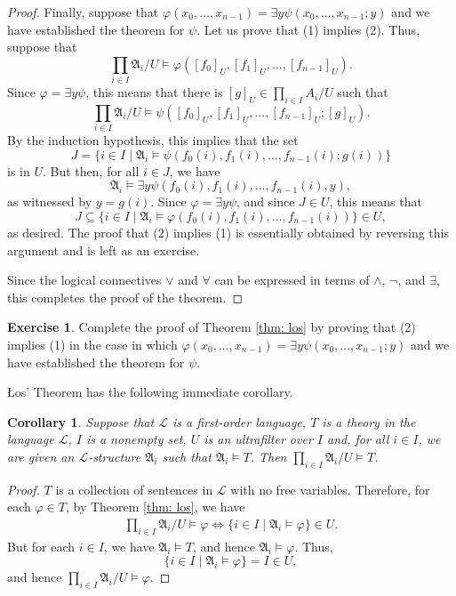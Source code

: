 \documentclass[a4paper]{memoir}
\newtheorem{corollary}[theorem]{Corollary}
\theoremstyle{definition}
\newtheorem{exercise}[theorem]{Exercise}
\newcommand{\mc}{\mathcal}
\begin{document}
\begin{proof}
  Finally, suppose that $\varphi(x_0, \ldots, x_{n-1}) = \exists y \psi(x_0, \ldots, x_{n-1};y)$ 
  and we have established the theorem for $\psi$. Let us prove that (1) implies (2). Thus, suppose that
  \[
    \prod_{i \in I} \mathfrak{A}_i/U \models \varphi([f_0]_U, [f_1]_U, \ldots, [f_{n-1}]_U).
  \]
  Since $\varphi = \exists y \psi$, this means that there is $[g]_U \in \prod_{i \in I} A_i/U$ such that
  \[
    \prod_{i \in I} \mathfrak{A}_i/U \models \psi([f_0]_U, [f_1]_U, \ldots, [f_{n-1}]_U; [g]_U).
  \]
  By the induction hypothesis, this implies that the set 
  \[
    J = \{i \in I \mid \mathfrak{A}_i \models \psi(f_0(i), f_1(i), \ldots, f_{n-1}(i); g(i))\}
  \]
  is in $U$. But then, for all $i \in J$, we have
  \[
    \mathfrak{A}_i \models \exists y \psi(f_0(i), f_1(i), \ldots, f_{n-1}(i), y),
  \]
  as witnessed by $y = g(i)$. Since $\varphi = \exists y \psi$, and since $J \in U$, this means that 
  \[
    J \subseteq \{i \in I \mid \mathfrak{A}_i \models \varphi(f_0(i), f_1(i), \ldots, f_{n-1}(i))\} 
    \in U, 
  \]
  as desired. The proof that (2) implies (1) is essentially obtained by reversing this argument and 
  is left as an exercise.
  
  Since the logical connectives $\vee$ and $\forall$ can be expressed in terms of $\wedge$, $\neg$, and 
  $\exists$, this completes the proof of the theorem.
\end{proof}

\begin{exercise}
  Complete the proof of Theorem \ref{thm: los} by proving that (2) implies (1) in the case in which 
  $\varphi(x_0, \ldots, x_{n-1}) = \exists y \psi(x_0, \ldots, x_{n-1};y)$ 
  and we have established the theorem for $\psi$.
\end{exercise}

\L os' Theorem has the following immediate corollary.

\begin{corollary} \label{cor: los}
  Suppose that $\mc{L}$ is a first-order language, $T$ is a theory in the language $\mc{L}$, 
  $I$ is a nonempty set, $U$ is an ultrafilter over $I$ and, for all $i \in I$, we are given 
  an $\mc{L}$-structure $\mathfrak{A}_i$ such that $\mathfrak{A}_i \models T$. 
  Then $\prod_{i \in I} \mathfrak{A}_i /U \models T$.
\end{corollary}

\begin{proof}
  $T$ is a collection of sentences in $\mc{L}$ with no free variables. Therefore, for each 
  $\varphi \in T$, by Theorem \ref{thm: los}, we have 
  \begin{align*}
    \prod_{i \in I} \mathfrak{A}_i /U \models \varphi \Longleftrightarrow 
    \{i \in I \mid \mathfrak{A}_i \models \varphi\} \in U.
  \end{align*}
  But for each $i \in I$, we have $\mathfrak{A}_i \models T$, and hence 
  $\mathfrak{A}_i \models \varphi$. Thus, 
  \[
    \{i \in I \mid \mathfrak{A}_i \models \varphi\} = I \in U, 
  \]
  and hence $\prod_{i \in I} \mathfrak{A}_i /U \models \varphi$.
\end{proof}
\end{document}
